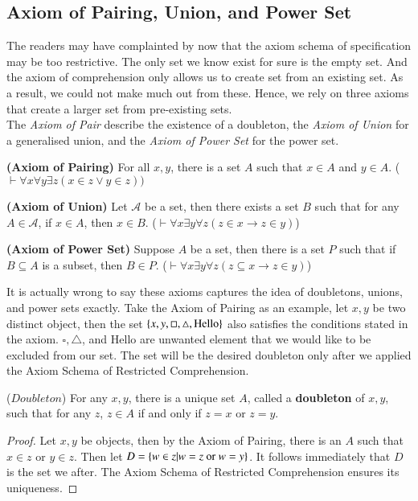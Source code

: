 \subsection{Axiom of Pairing, Union, and Power Set} 
The readers may have complainted by now that the axiom schema of specification may be too restrictive. The only set we know exist for sure is the empty set. And the axiom of comprehension only allows us to create set from an existing set. As a result, we could not make much out from these. Hence, we rely on three axioms that create a larger set from pre-existing sets.\\
The \textit{Axiom of Pair} describe the existence of a doubleton, the \textit{Axiom of Union} for a generalised union, and the \textit{Axiom of Power Set} for the power set.
\begin{ax}
    \textbf{(Axiom of Pairing)} For all $x,y$, there is a set $A$ such that $x\in A$ and $y\in A$. ($\vdash \forall x\forall y\exists z (x\in z\vee y\in z))$
\end{ax}
\begin{ax}
    \textbf{(Axiom of Union)} Let $\mathscr A$ be a set, then there exists a set $B$ such that for any $A\in \mathscr A$, if $x\in A$, then $x\in B$. ($\vdash \forall x\exists y\forall z (z\in x\rightarrow z\in y)$)
\end{ax}
\begin{ax}
    \textbf{(Axiom of Power Set)} Suppose $A$ be a set, then there is a set $P$ such that if $B\subseteq A$ is a subset, then $B\in P$. ($\vdash \forall x\exists y\forall z (z\subseteq x\rightarrow z\in y)$)
\end{ax}
It is actually wrong to say these axioms captures the idea of doubletons, unions, and power sets exactly. Take the Axiom of Pairing as an example, let $x,y$ be two distinct object, then the set $\{x,y,\square, \triangle,\text{Hello}\}$ also satisfies the conditions stated in the axiom. $\square, \triangle$, and Hello are unwanted element that we would like to be excluded from our set. The set will be the desired doubleton only after we applied the Axiom Schema of Restricted Comprehension.
\begin{prop}
    ($Doubleton$) For any $x,y$, there is a unique set $A$, called a \textbf{doubleton} of $x,y$, such that for any $z$, $z\in A$ if and only if $z=x$ or $z=y$.
\end{prop}
\begin{proof}
    Let $x,y$ be objects, then by the Axiom of Pairing, there is an $A$ such that $x\in z$ or $y\in z$. Then let $D = \{w\in z| w=z\text{ or }w=y\}$. It follows immediately that $D$ is the set we after. The Axiom Schema of Restricted Comprehension ensures its uniqueness.
\end{proof}
